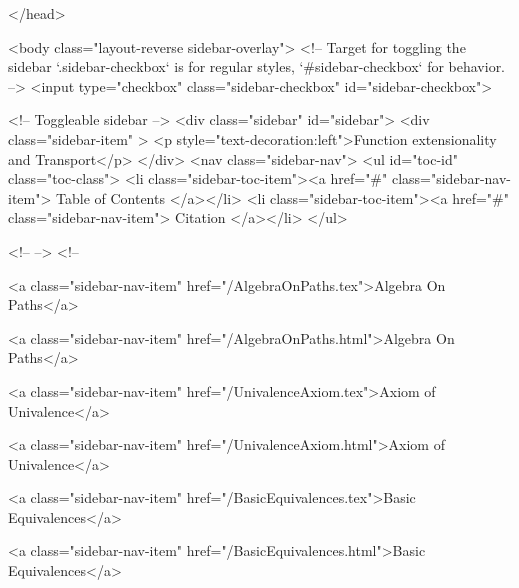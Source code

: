   
</head>




  <body class="layout-reverse sidebar-overlay">
    <!-- Target for toggling the sidebar `.sidebar-checkbox` is for regular
     styles, `#sidebar-checkbox` for behavior. -->
<input type="checkbox" class="sidebar-checkbox" id="sidebar-checkbox">

<!-- Toggleable sidebar -->
<div class="sidebar" id="sidebar">
  <div class="sidebar-item" >
    <p style="text-decoration:left">Function extensionality and Transport</p>
  </div>
  <nav class="sidebar-nav">
    <ul id="toc-id" class="toc-class">
  <li class="sidebar-toc-item"><a href="#" class="sidebar-nav-item"> Table of Contents </a></li>
  <li class="sidebar-toc-item"><a href="#" class="sidebar-nav-item"> Citation </a></li>
</ul>


    <!--  -->
    <!-- 
      
    
      
    
      
    
      
    
      
        
      
    
      
        
          <a class="sidebar-nav-item" href="/AlgebraOnPaths.tex">Algebra On Paths</a>
        
      
    
      
        
          <a class="sidebar-nav-item" href="/AlgebraOnPaths.html">Algebra On Paths</a>
        
      
    
      
        
          <a class="sidebar-nav-item" href="/UnivalenceAxiom.tex">Axiom of Univalence</a>
        
      
    
      
        
          <a class="sidebar-nav-item" href="/UnivalenceAxiom.html">Axiom of Univalence</a>
        
      
    
      
        
          <a class="sidebar-nav-item" href="/BasicEquivalences.tex">Basic Equivalences</a>
        
      
    
      
        
          <a class="sidebar-nav-item" href="/BasicEquivalences.html">Basic Equivalences</a>
        
